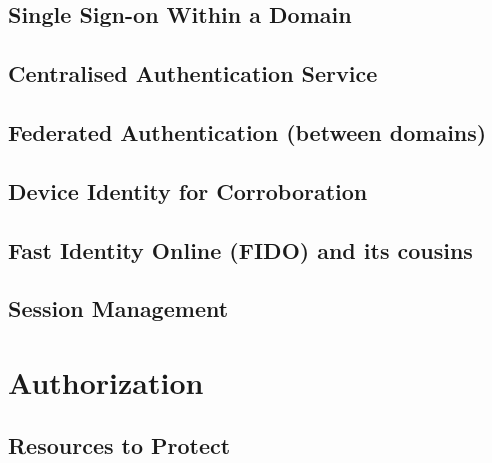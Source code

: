 \hypertarget{single-sign-on-within-a-domain}{%
\subsection{Single Sign-on Within a
Domain}\label{single-sign-on-within-a-domain}}

\hypertarget{centralised-authentication-service}{%
\subsection{Centralised Authentication
Service}\label{centralised-authentication-service}}

\hypertarget{federated-authentication-between-domains}{%
\subsection{Federated Authentication (between
domains)}\label{federated-authentication-between-domains}}

\hypertarget{device-identity-for-corroboration}{%
\subsection{Device Identity for
Corroboration}\label{device-identity-for-corroboration}}

\hypertarget{fast-identity-online-fido-and-its-cousins}{%
\subsection{Fast Identity Online (FIDO) and its
cousins}\label{fast-identity-online-fido-and-its-cousins}}

\hypertarget{session-management}{%
\subsection{Session Management}\label{session-management}}

\hypertarget{authorization}{%
\section{Authorization}\label{authorization}}

\hypertarget{resources-to-protect}{%
\subsection{Resources to Protect}\label{resources-to-protect}}

